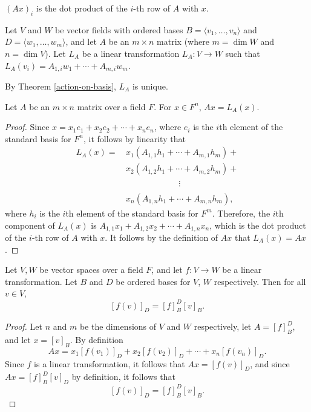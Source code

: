 \begin{rmk}
    $(Ax)_i$ is the dot product of the $i$-th row of $A$ with $x$.
\end{rmk}

\begin{defn}
    Let $V$ and $W$ be vector fields with ordered bases $B = \langle v_1, \ldots, v_n \rangle$ and $D = \langle w_1, \ldots, w_m \rangle$, and let $A$ be an $m \times n$ matrix (where $m = \dim W$ and $n = \dim V$). Let $L_A$ be a linear transformation $L_A: V \to W$ such that $L_A(v_i) = A_{1,i}w_1 + \cdots + A_{m,i}w_m$.
\end{defn}

\begin{rmk}
    By Theorem \ref{action-on-basis}, $L_A$ is unique.
\end{rmk}

\begin{prop}\label{matrix-transformation-duality}
    Let $A$ be an $m \times n$ matrix over a field $F$. For $x \in F^n$, $Ax = L_A(x)$.
\end{prop}

\begin{proof}
    Since $x = x_1e_1 + x_2e_2 + \cdots + x_ne_n$, where $e_i$ is the $i$th element of the standard basis for $F^n$, it follows by linearity that
    \begin{align*}
        L_A(x) = \,&x_1(A_{1, 1}h_1 + \cdots + A_{m, 1}h_m) +\\
        &x_2(A_{1, 2}h_1 + \cdots + A_{m, 2}h_m) + \\
        &\phantom{x_1(A_{1, 1}h_1 +\;\;\;} \vdots \\
        &x_n(A_{1, n}h_1 + \cdots + A_{m, n}h_m),
    \end{align*}
    where $h_i$ is the $i$th element of the standard basis for $F^m$. Therefore, the $i$th component of $L_A(x)$ is $A_{1, 1}x_1 + A_{1, 2}x_2 + \cdots + A_{1, n}x_n$, which is the dot product of the $i$-th row of $A$ with $x$. It follows by the definition of $Ax$ that $L_A(x) = Ax$.
\end{proof}

\begin{thm}
    Let $V,W$ be vector spaces over a field $F$, and let $f: V \to W$ be a linear transformation. Let $B$ and $D$ be ordered bases for $V$, $W$ respectively. Then for all $v \in V$,
    \[[f(v)]_D = [f]_B^D[v]_B.\]
\end{thm}

\begin{proof}
    Let $n$ and $m$ be the dimensions of $V$ and $W$ respectively, let $A = [f]_B^D$, and let $x = [v]_B$. By definition \[Ax = x_1[f(v_1)]_D + x_2[f(v_2)]_D + \cdots + x_n[f(v_n)]_D.\] Since $f$ is a linear transformation, it follows that $Ax = [f(v)]_D$, and since $Ax = [f]_B^D[v]_D$ by definition, it follows that \[[f(v)]_D = [f]_B^D[v]_B.\]
\end{proof}

